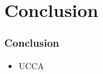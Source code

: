 \documentclass[t]{beamer}
\begin{document}
\section[]{Conclusion}

\begin{frame}
\frametitle{Conclusion}
\begin{itemize}
 \item UCCA
\end{itemize}
\end{frame}
\end{document}
